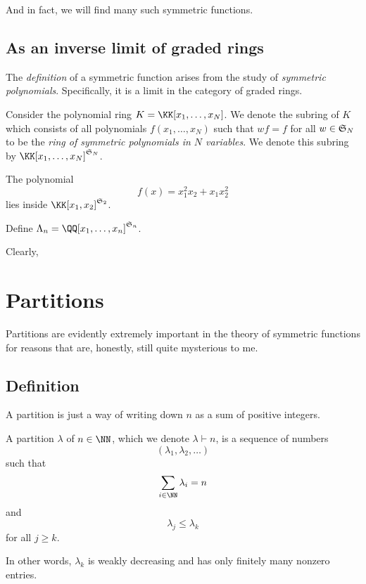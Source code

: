 \documentclass{article}
\newcommand{\frkS}{\ensuremath\mathfrak{S}}
\begin{document}
And in fact, we will find many such symmetric functions.

\subsection{As an inverse limit of graded rings}

The \textit{definition} of a symmetric function arises from the study of \textit{symmetric polynomials}. Specifically, it is a limit in the category of graded rings.

Consider the polynomial ring $K = \KK[x_1,\ldots,x_N]$. We denote the subring of $K$ which consists of all polynomials $f(x_1,\ldots,x_N)$ such that $wf = f$ for all $w \in \frkS_N$ to be the \textit{ring of symmetric polynomials in $N$ variables}.
We denote this subring by $\KK[x_1,\ldots,x_N]^{\frkS_N}$.

\begin{example}
    The polynomial
    \[
        f(x) = x_1^2x_2 + x_1x_2^2
    \]
    lies inside $\KK[x_1,x_2]^{\frkS_2}$.
\end{example}

Define $\Lambda_n = \QQ[x_1,\ldots,x_n]^{\frkS_n}$.

Clearly, 

\section{Partitions}

Partitions are evidently extremely important in the theory of symmetric functions for reasons that are, honestly, still quite mysterious to me.

\subsection{Definition}

A partition is just a way of writing down $n$ as a sum of positive integers.

\begin{definition}
    A partition $\lambda$ of $n \in \NN$, which we denote $\lambda \vdash n$, is a sequence of numbers 
    \[
        (\lambda_1,\lambda_2,\ldots)
    \]
    such that 
    \[
        \sum_{i\in\NN}\lambda_i = n
    \]
    and 
    \[
        \lambda_j \leq \lambda_k
    \]
    for all $j\geq k$.
\end{definition}

In other words, $\lambda_k$ is weakly decreasing and has only finitely many nonzero entries.
\end{document}
